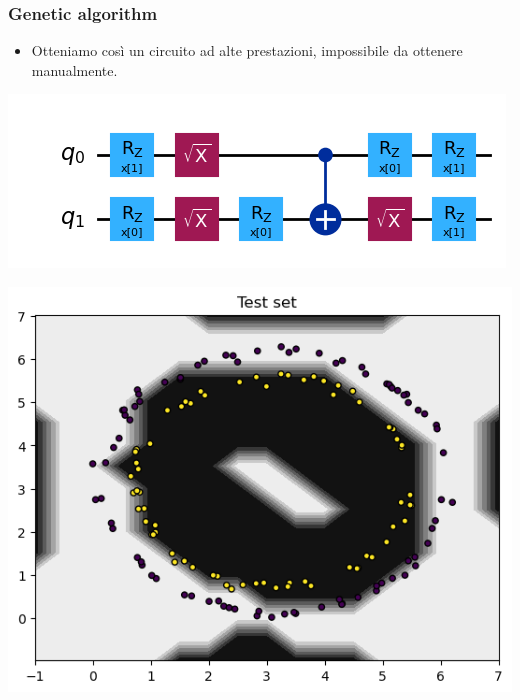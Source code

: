 \documentclass{beamer}
\begin{document}
\begin{frame}
  \frametitle{Genetic algorithm}
  \begin{itemize}
    \item Otteniamo così un circuito ad alte prestazioni, impossibile da ottenere manualmente.
  \end{itemize}
  \vspace{0.8cm}

  \begin{minipage}{0.5\textwidth}
    \centering
    \includegraphics[width=\textwidth]{images/finalcircuit.png}
\end{minipage}%
\begin{minipage}{0.5\textwidth}
    \centering
    \includegraphics[width=\textwidth]{images/awesomeresult.png}
\end{minipage}
\end{frame}
\end{document}

